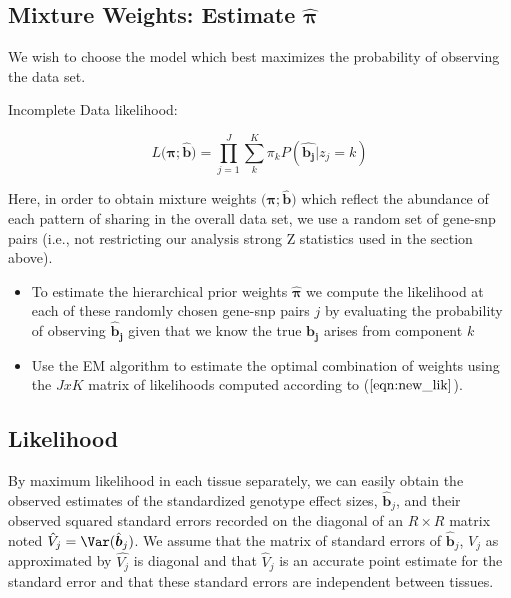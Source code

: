 \begin{enumerate}
\subsection{Mixture Weights: Estimate $\hat{\bm{\pi}}$}
We wish to choose the model which best maximizes the probability of observing the data set. 

Incomplete Data likelihood:

\begin{equation}
L(\bm\pi;{\hat{\bm{b}})} = \prod_{j=1}^J \sum_{k}^{K} \pi_{k} P(\hat{\bm{b_{j}}} | z_{j}=k)
\label{eq:pihat}
\end{equation}

Here, in order to obtain mixture weights $(\bm\pi;{\hat{\bm{b}})}$ which reflect the abundance of each pattern of sharing in the overall data set, we use a random set of gene-snp pairs (i.e., not restricting our analysis strong Z statistics used in the section above). 

\begin{itemize}
\item  To estimate the hierarchical prior weights $\hat{\bm{\pi}}$ we compute the likelihood at each of these randomly chosen gene-snp pairs $j$ by evaluating the probability of observing $\bm{\hat{b}_{j}}$ given that we know the true $\bm{b_{j}}$ arises from component $k$
\item  Use the EM algorithm to estimate the optimal combination of weights using the  $JxK$ matrix of likelihoods computed according to ($\ref{eqn:new_lik}$).
\end{itemize}


\subsection{Likelihood}

By maximum likelihood in each tissue separately, we can easily obtain the observed estimates of the standardized genotype effect sizes, $\hat{\bm{b}}_{j}$, and their observed squared standard errors recorded on the diagonal of an $R \times R$ matrix noted $\hat{V}_{j} = \Var(\hat{\bm{b}}_{j})$. 
We assume that the matrix of standard errors of $\hat{\bm{b}}_{j}$, $V_{j}$ as approximated by $\hat{V_{j}}$ is diagonal and  that $\hat{V}_{j}$ is an accurate point estimate for the standard error and that these standard errors are independent between tissues.


\end{enumerate}
